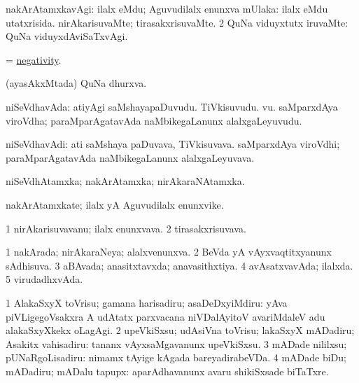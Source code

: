 \bentry
{}
\gl{\kirxvi}
\bmng
\bnum
{} nakArAtamxkavAgi: 
\banum
{} ilalx eMdu; Aguvudilalx enunxva mUlaka:  ilalx eMdu utatxrisida. 
 nirAkarisuvaMte; tirasakxrisuvaMte. 
\eanum
\numie
\num{2} QuNa viduyxtutx iruvaMte:  QuNa viduyxdAviSaTxvAgi. 
\enum
\emng
\eentry

\bentry
{}
\gl{\nA}
\bmng
= \hyperlink{negativity}{negativity}. 
\emng
\eentry

\bentry
{}
\gl{\nA}
\bmng
(ayasAkxMtada) QuNa dhurxva. 
\emng
\eentry

\bentry
{}
\gl{\nA}
\bmng
niSeVdhavAda: 
\banum
{} atiyAgi saMshayapaDuvudu. TiVkisuvudu. \mo vu. 
 saMparxdAya viroVdha; paraMparAgatavAda naMbikegaLanunx alalxgaLeyuvudu. 
\eanum
\emng
\eentry

\bentry
{}
\gl{\nA}
\bmng
niSeVdhavAdi: 
\banum
{} ati saMshaya paDuvava, TiVkisuvava. 
 saMparxdAya viroVdhi; paraMparAgatavAda naMbikegaLanunx alalxgaLeyuvava. 
\eanum
\emng
\eentry

\bentry
{}
\gl{\gu}
\bmng
niSeVdhAtamxka; nakArAtamxka; nirAkaraNAtamxka. 
\emng
\eentry

\bentry
{}
\gl{\nA}
\bmng
nakArAtamxkate; ilalx yA Aguvudilalx enunxvike. 
\emng
\eentry

\bentry
{}
\gl{\nA}
\bmng
\bnum
\num{1} nirAkarisuvavanu; ilalx enunxvava. 
\num{2} tirasakxrisuvava. 
\enum
\emng
\eentry

\bentry
{}
\gl{\gu}
\bmng
\bnum
\num{1} nakArada; nirAkaraNeya; alalxvenunxva. 
\num{2} BeVda yA vAyxvaqtitxyanunx sAdhisuva. 
\num{3} aBAvada; anasitxtavxda; anavasithxtiya. 
\num{4} avAsatxvavAda; ilalxda. 
\num{5} virudadhxvAda. 
\enum
\emng
\eentry

\bentry
{}
\gl{\sakirx}
\bmng
\bnum
\num{1} AlakaSxyX toVrisu; gamana harisadiru; asaDeDxyiMdiru:  yAva piVLigegoVsakxra A udAtatx parxvacana niVDalAyitoV avariMdaleV adu alakaSxyXkekx oLagAgi. 
\num{2} upeVkiSxsu; udAsiVna toVrisu; lakaSxyX mADadiru; Asakitx vahisadiru:  tananx vAyxsaMgavanunx upeVkiSxsu. 
\num{3} mADade nililxsu; pUNaRgoLisadiru:  nimamx tAyige kAgada bareyadirabeVDa. 
\num{4} mADade biDu; mADadiru; mADalu tapupx:  aparAdhavanunx avaru shikiSxsade biTaTxre. 
\enum
\emng
\eentry

